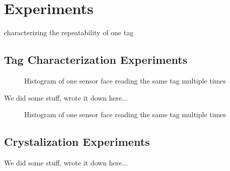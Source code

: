 \section{Experiments}
\label{sec:Experiments}
characterizing the repeatability of one tag

\subsection{Tag Characterization Experiments}

\begin{figure}[H]
	
	\caption{Histogram of one sensor face reading the same tag multiple times}
	\label{fig:histogram}
\end{figure}

We did some stuff, wrote it down here...

\begin{figure}[H]
	
	\caption{Histogram of one sensor face reading the same tag multiple times}
	\label{fig:histogram}
\end{figure}

\subsection{Crystalization Experiments}


We did some stuff, wrote it down here...
